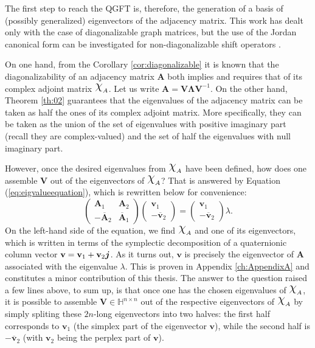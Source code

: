 The first step to reach the QGFT is, therefore, the generation of a basis of (possibly generalized) eigenvectors of the adjacency matrix. This work has dealt only with the case of diagonalizable graph matrices, but the use of the Jordan canonical form can be investigated for non-diagonalizable shift operators \cite{Longxuan1996}.

On one hand, from the Corollary \ref{cor:diagonalizable} it is known that the diagonalizability of an adjacency matrix $\mathbf{A}$ both implies and requires that of its complex adjoint matrix $\rchi_A$. Let us write $\mathbf{A} = \mathbf{V} \mathbf{\Lambda} \mathbf{V}^{-1}$. On the other hand, Theorem \ref{th:02} guarantees that the eigenvalues of the adjacency matrix can be taken as half the ones of its complex adjoint matrix. More specifically, they can be taken as the union of the set of eigenvalues with positive imaginary part (recall they are complex-valued) and the set of half the eigenvalues with null imaginary part.

However, once the desired eigenvalues from $\rchi_A$ have been defined, how does one assemble $\mathbf{V}$ out of the eigenvectors of $\rchi_A$? That is answered by Equation (\ref{eq:eigvalueequation}), which is rewritten below for convenience:
\begin{equation*}
\begin{pmatrix}
\mathbf{A}_1 & \mathbf{A}_2\\ 
- \overline{\mathbf{A}}_2 & \overline{\mathbf{A}}_1
\end{pmatrix}
\begin{pmatrix}
\mathbf{v}_1 \\ 
- \overline{\mathbf{v}}_2
\end{pmatrix} =
\begin{pmatrix}
\mathbf{v}_1 \\ 
- \overline{\mathbf{v}}_2
\end{pmatrix}
\lambda.
\end{equation*}
On the left-hand side of the equation, we find $\rchi_A$ and one of its eigenvectors, which is written in terms of the symplectic decomposition of a quaternionic column vector $\mathbf{v} = \mathbf{v}_1 + \mathbf{v}_2 \boldsymbol{j}$. As it turns out, $\mathbf{v}$ is precisely the eigenvector of $\mathbf{A}$ associated with the eigenvalue $\lambda$. This is proven in Appendix \ref{ch:AppendixA} and constitutes a minor contribution of this thesis. The answer to the question raised a few lines above, to sum up, is that once one has the chosen eigenvalues of $\rchi_A$, it is possible to assemble $\mathbf{V} \in \mathbb{H}^{n \times n}$ out of the respective eigenvectors of $\rchi_A$ by simply spliting these $2n$-long eigenvectors into two halves: the first half corresponds to $\mathbf{v}_1$ (the simplex part of the eigenvector $\mathbf{v}$), while the second half is $- \overline{\mathbf{v}}_2$ (with $\mathbf{v}_2$ being the perplex part of $\mathbf{v}$).

